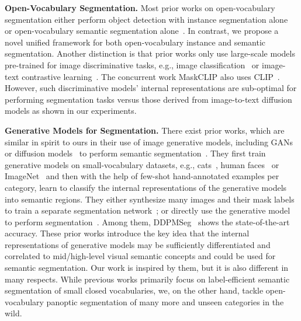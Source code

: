 \documentclass[10pt,twocolumn,letterpaper]{article}
\begin{document}
\textbf{Open-Vocabulary Segmentation.} 
Most prior works on open-vocabulary segmentation either perform object detection with instance segmentation alone~\cite{gu2021vild,zhou2022detic, du2022detpro, ghiasi2021open, minderer2022simple, zhong2022regionclip,zareian2021ovrccn,li2022glip,zang2022ovdetr} or open-vocabulary semantic segmentation alone~\cite{li2022language,ghiasi2021open, xu2022groupvit,zhou2021denseclip}. In contrast, we propose a novel unified framework for both open-vocabulary instance and semantic segmentation. Another distinction is that prior works only use large-scale models pre-trained for image discriminative tasks, e.g., image classification~\cite{he2016resnet, liu2021swin} or image-text contrastive learning~\cite{radford2021clip, jia2021align, mu2021slip, li2021supervision}. The concurrent work MaskCLIP\cite{ding2022open} also uses CLIP~\cite{radford2021clip}. However, such discriminative models' internal representations are sub-optimal for performing segmentation tasks versus those derived from image-to-text diffusion models as shown in our experiments. 

\textbf{Generative Models for Segmentation.} There exist prior works, which are similar in spirit to ours in their use of image generative models, including GANs~\cite{karras2019stylegan,brock2018biggan,esser2021vqgan, karras2020styleganv2, zhu2017cyclegan} or diffusion models~\cite{ho2020denoising, song2020score, song2020ddim, sohl2015deep, song2019generative, vahdat2021score, dockhorn2021score, jolicoeur2020adversarial, song2020improved, dhariwal2021diffusion, nichol2021improved} to perform semantic segmentation~\cite{zhang2021datasetgan,li2022bigdatasetgan,baranchuk2021ddpmseg, tritrong2021repurposing, galeev2021learning, meng2021sdedit}. They first train generative models on small-vocabulary datasets, e.g.,  cats~\cite{yu2015lsun}, human faces~\cite{karras2019stylegan} or ImageNet~\cite{deng2009imagenet} and then with the help of few-shot hand-annotated examples per category, learn to classify the internal representations of the generative models into semantic regions. They either synthesize many images and their mask labels to train a separate segmentation network~\cite{zhang2021datasetgan,li2022bigdatasetgan}; or directly use the generative model to perform segmentation~\cite{baranchuk2021ddpmseg}. Among them, DDPMSeg~\cite{baranchuk2021ddpmseg} shows the state-of-the-art accuracy. These prior works introduce the key idea that the internal representations of generative models may be sufficiently differentiated and correlated to mid/high-level visual semantic concepts and could be used for semantic segmentation. Our work is inspired by them, but it is also different in many respects. While previous works primarily focus on label-efficient semantic segmentation of small closed vocabularies, we, on the other hand, tackle open-vocabulary panoptic segmentation of many more and unseen categories in the wild.
\end{document}
